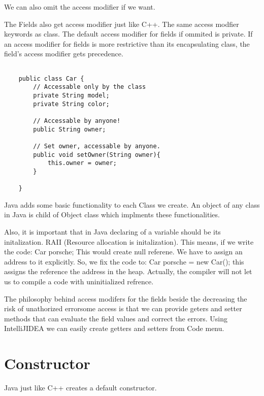 \documentclass[11pt,twoside,a4paper]{report}
\begin{document}
We can also omit the access modifier if we want.

The Fields also get access modifier just like C++. The same access modfier keywords as class.
The default access modifier for fields if ommited is private. If an access modifier for fields is more restrictive than its encapsulating class,
the field's access modifier gets precedence.
\begin{lstlisting}

    public class Car {
        // Accessable only by the class
        private String model;
        private String color;

        // Accessable by anyone!
        public String owner;

        // Set owner, accessable by anyone.
        public void setOwner(String owner){
            this.owner = owner;
        }

    }

\end{lstlisting}



Java adds some basic functionality to each Class we create. An object of any class in Java is child of Object class which implments these functionalities.

Also, it is important that in Java declaring of a variable should be its initalization. RAII (Resource allocation is initalization).
This means, if we write the code: Car porsche; This would create null referene. We have to assign an address to it explicitly. So, we fix the code to:  Car porsche = new Car();
this assigns the reference the address in the heap. Actually, the compiler will not let us to compile a code with uninitialized refrence.

The philosophy behind access modifers for the fields beside the decreasing the risk of unathorized errorsome access is that we can provide geters and setter methods that can 
evaluate the field values and correct the errors. Using IntelliJIDEA we can easily create getters and setters from Code menu.

\section{Constructor}
Java just like C++ creates a default constructor.
\end{document}
